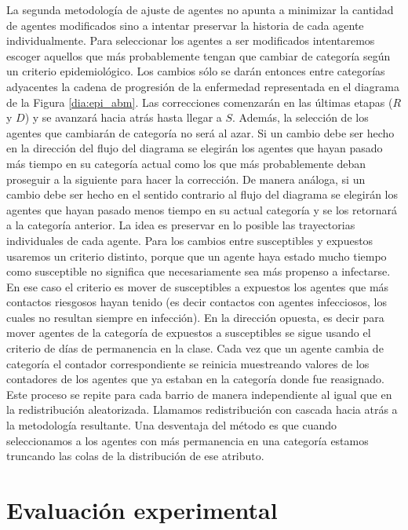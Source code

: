 La segunda metodología de ajuste de agentes no apunta a minimizar la cantidad de agentes modificados sino a intentar preservar la historia de cada agente individualmente. Para seleccionar los agentes a ser modificados intentaremos escoger aquellos que más probablemente tengan que cambiar de categoría según un criterio epidemiológico. Los cambios sólo se darán entonces entre categorías adyacentes la cadena de progresión de la enfermedad representada en el diagrama de la Figura \ref{dia:epi_abm}. Las correcciones comenzarán en las últimas etapas ($R$ y $D$) y se avanzará hacia atrás hasta llegar a $S$. Además, la selección de los agentes que cambiarán de categoría no será al azar. Si un cambio debe ser hecho en la dirección del flujo del diagrama se elegirán los agentes que hayan pasado más tiempo en su categoría actual como los que más probablemente deban proseguir a la siguiente para hacer la corrección. De manera análoga, si un cambio debe ser hecho en el sentido contrario al flujo del diagrama se elegirán los agentes que hayan pasado menos tiempo en su actual categoría y se los retornará a la categoría anterior. La idea es preservar en lo posible las trayectorias individuales de cada agente. Para los cambios entre susceptibles y expuestos usaremos un criterio distinto, porque que un agente haya estado mucho tiempo como susceptible no significa que necesariamente sea más propenso a infectarse. En ese caso el criterio es mover de susceptibles a expuestos los agentes que más contactos riesgosos hayan tenido (es decir contactos con agentes infecciosos, los cuales no resultan siempre en infección). En la dirección opuesta, es decir para mover agentes de la categoría de expuestos a susceptibles se sigue usando el criterio de días de permanencia en la clase. Cada vez que un agente cambia de categoría el contador correspondiente se reinicia muestreando valores de los contadores de los agentes que ya estaban en la categoría donde fue reasignado. Este proceso se repite para cada barrio de manera independiente al igual que en la redistribución aleatorizada. Llamamos redistribución con cascada hacia atrás a la metodología resultante. Una desventaja del método es que cuando seleccionamos a los agentes con más permanencia en una categoría estamos truncando las colas de la distribución de ese atributo.

\section{Evaluación experimental}

